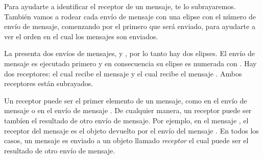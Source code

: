 \documentclass[a4paper,10pt,twoside]{book}
\begin{document}


Para ayudarte a identificar el receptor de un mensaje, te lo subrayaremos.
Tambi\'en vamos a rodear cada env\'io de mensaje con una elipse con el n\'umero de env\'io de mensaje, comenzando por el primero que ser\'a enviado, para ayudarte a ver el orden en el cual los mensajes son enviados. 


La  presenta dos env\'ios de mensajes,  y , por lo tanto hay dos elipses. El env\'io de mensaje  es ejecutado primero y en consecuencia su elipse es numerada con .  Hay dos receptores:  el cual recibe el mensaje  y  el cual recibe el mensaje . Ambos receptores est\'an subrayados.

Un receptor puede ser el primer elemento de un mensaje, como  en el env\'io de mensaje  o  en el env\'io de mensaje . De cualquier manera, un receptor puede ser tamb\'ien el resultado de otro env\'io de mensaje. Por ejemplo, en el mensaje , el receptor del mensaje  es el objeto devuelto por el env\'io del mensaje . En todos los casos, un mensaje es enviado a un objeto llamado \emph{receptor} el cual puede ser el resultado de otro env\'io de mensaje.
\end{document}
